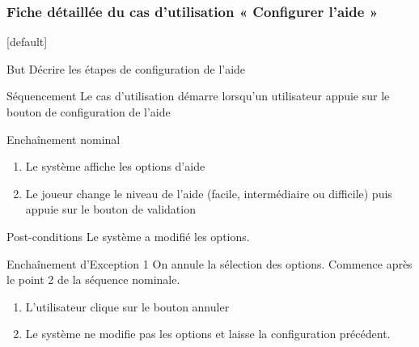 \documentclass{beamer}
\begin{document}
\begin{frame}
  \frametitle{Fiche détaillée du cas d'utilisation « Configurer l’aide »}
  [default]
  \begin{block}{\footnotesize{But}}
\scriptsize{Décrire les étapes de configuration de l’aide}
  \end{block}
  \pause
  \begin{block}{\footnotesize{Séquencement}}
\scriptsize{Le cas d'utilisation démarre lorsqu’un utilisateur appuie sur le bouton de configuration de l’aide}
  \end{block}
  \pause
  \begin{block}{\footnotesize{Enchaînement nominal}}
    \begin{enumerate}    
      [circle]
    \item
      \scriptsize{Le système affiche les options d’aide}
    \item
      \scriptsize{Le joueur change le niveau de l’aide (facile, intermédiaire ou difficile) puis appuie sur le bouton de validation}
    \end{enumerate}
\pause 
 \end{block}
  \begin{block}{\footnotesize{Post-conditions}}
    \scriptsize{Le système a modifié les options.}
\pause
  \end{block}
  \begin{block}{\footnotesize{Enchaînement d’Exception 1}}
    \scriptsize{On annule la sélection des options. Commence après le point 2 de la séquence nominale.}
    \begin{enumerate}    
      [circle]
    \item
      \scriptsize{L’utilisateur clique sur le bouton annuler}
    \item
      \scriptsize{Le système ne modifie pas les options et laisse la configuration précédent.}
    \end{enumerate}
  \end{block}
\end{frame}
\end{document}
